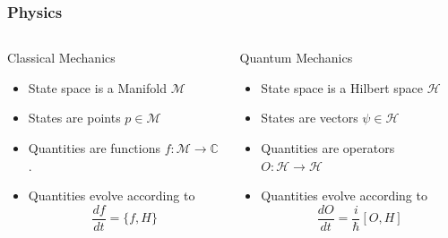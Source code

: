 \documentclass{beamer}
\newcommand{\Cplx}{\mathbb{C}}
\begin{document}
\begin{frame}
\frametitle{Physics}
        \begin{columns}[T]
            \begin{column}{.5\textwidth}
                \begin{block}{Classical Mechanics}
                    \begin{itemize}
                        \item{} State space is a Manifold $\mathcal{M}$
                        \item{} States are points $p \in \mathcal{M}$
                        \item{} Quantities are functions $f:\mathcal{M}\rightarrow\Cplx$.
                        \item{} Quantities evolve according to
                        \begin{equation*}
                            \frac{df}{dt} = \{f,H\}
                        \end{equation*}
                    \end{itemize}
                \end{block}
            \end{column}
        
        
            \begin{column}{.5\textwidth}
                \begin{block}{Quantum Mechanics}
                    \begin{itemize}
                        \item{} State space is a Hilbert space $\mathcal{H}$
                        \item{} States are vectors $\psi \in \mathcal{H}$
                        \item{} Quantities are operators $O:\mathcal{H}\rightarrow\mathcal{H}$
                        \item{} Quantities evolve according to
                        \begin{equation*}
                            \frac{dO}{dt} = \frac{i}{\hbar}[O,H]
                        \end{equation*}
                    \end{itemize}
                \end{block}
            \end{column}
        \end{columns}
\end{frame}
\end{document}
